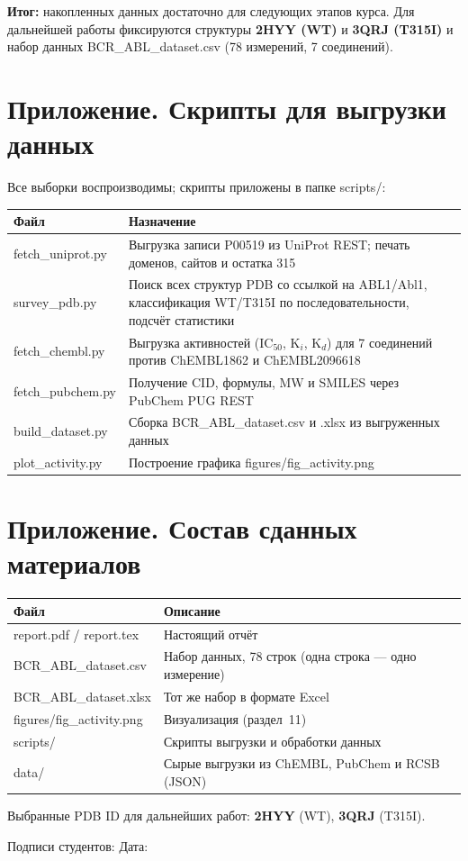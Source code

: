 \documentclass[12pt,a4paper]{article}
\newcommand{\code}[1]{{\ttfamily #1}}
\begin{document}
\medskip
\noindent\textbf{Итог:} накопленных данных достаточно для следующих этапов курса.
Для дальнейшей работы фиксируются структуры \textbf{2HYY (WT)} и \textbf{3QRJ (T315I)}
и набор данных \code{BCR\_ABL\_dataset.csv} (78 измерений, 7 соединений).

\appendix
\section{Приложение. Скрипты для выгрузки данных}
\label{app:scripts}

Все выборки воспроизводимы; скрипты приложены в папке \code{scripts/}:

\begin{center}
\small
\begin{tabular}{L{5.0cm}L{9.5cm}}
\toprule
\textbf{Файл} & \textbf{Назначение} \\
\midrule
\code{fetch\_uniprot.py} & Выгрузка записи P00519 из UniProt REST; печать доменов, сайтов и остатка 315 \\
\code{survey\_pdb.py} & Поиск всех структур PDB со ссылкой на ABL1/Abl1, классификация WT/T315I по последовательности, подсчёт статистики \\
\code{fetch\_chembl.py} & Выгрузка активностей (IC$_{50}$, K$_i$, K$_d$) для 7 соединений против ChEMBL1862 и ChEMBL2096618 \\
\code{fetch\_pubchem.py} & Получение CID, формулы, MW и SMILES через PubChem PUG REST \\
\code{build\_dataset.py} & Сборка \code{BCR\_ABL\_dataset.csv} и \code{.xlsx} из выгруженных данных \\
\code{plot\_activity.py} & Построение графика \code{figures/fig\_activity.png} \\
\bottomrule
\end{tabular}
\end{center}

\section{Приложение. Состав сданных материалов}

\begin{center}
\small
\begin{tabular}{L{5.5cm}L{9.0cm}}
\toprule
\textbf{Файл} & \textbf{Описание} \\
\midrule
\code{report.pdf} / \code{report.tex} & Настоящий отчёт \\
\code{BCR\_ABL\_dataset.csv} & Набор данных, 78 строк (одна строка --- одно измерение) \\
\code{BCR\_ABL\_dataset.xlsx} & Тот же набор в формате Excel \\
\code{figures/fig\_activity.png} & Визуализация (раздел~11) \\
\code{scripts/} & Скрипты выгрузки и обработки данных \\
\code{data/} & Сырые выгрузки из ChEMBL, PubChem и RCSB (JSON) \\
\bottomrule
\end{tabular}
\end{center}

\vspace{1.5cm}
\noindent Выбранные PDB ID для дальнейших работ: \textbf{2HYY} (WT), \textbf{3QRJ} (T315I).

\vspace{1cm}
\noindent Подписи студентов: \underline{\hspace{5cm}} \hfill Дата: \underline{\hspace{3.5cm}}
\end{document}
